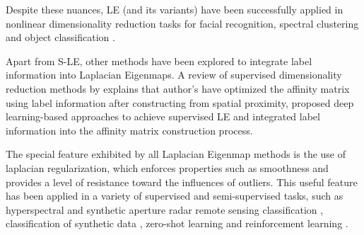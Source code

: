 Despite these nuances, LE (and its variants) have been successfully applied in nonlinear dimensionality reduction tasks for facial recognition, spectral clustering and object classification \citep{VanDerMaaten2009DRReview}.

Apart from S-LE, other methods have been explored to integrate label information into Laplacian Eigenmaps.  A review of supervised dimensionality reduction methods by \cite{Chao2019RecentAdvancesSupervisedDimRed} explains that author's have optimized the affinity matrix using label information after constructing from spatial proximity, proposed deep learning-based approaches to achieve supervised LE and integrated label information into the affinity matrix construction process.  

The special feature exhibited by all Laplacian Eigenmap methods is the use of laplacian regularization, which enforces properties such as smoothness and provides a level of resistance toward the influences of outliers.  This useful feature has been applied in a variety of supervised and semi-supervised tasks, such as hyperspectral and synthetic aperture radar remote sensing classification \citep{Ratle2010ManRegHSI, Ren2017ManRegSAR}, classification of synthetic data \citep{Tsang2007ManifoldRegularization}, zero-shot learning \citep{Meng2018ManRegZeroShot} and reinforcement learning \citep{Li2015ManRegReinforcementLearning}.


